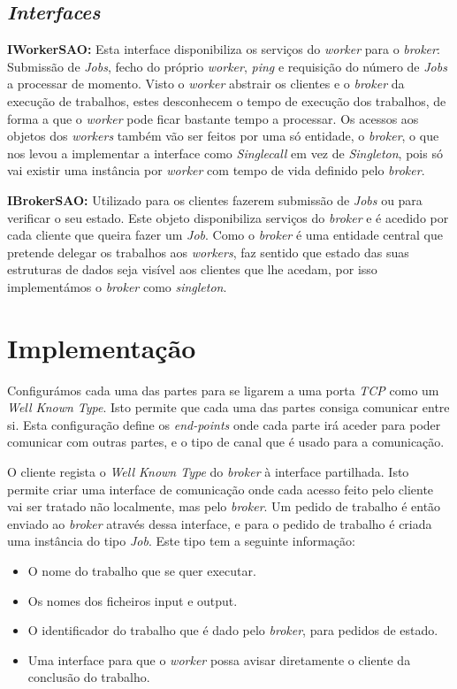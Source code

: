 \documentclass[a4paper]{article}
\begin{document}
\subsection{\emph{Interfaces}}

\textbf{IWorkerSAO:}
	Esta interface disponibiliza os serviços do \emph{worker} para o \emph{broker}: Submissão de \emph{Jobs}, fecho do próprio \emph{worker}, \emph{ping} e requisição do número de \emph{Jobs} a processar de momento. Visto o \emph{worker} abstrair os clientes e o \emph{broker} da execução de trabalhos, estes desconhecem o tempo de execução dos trabalhos, de forma a que o \emph{worker} pode ficar bastante tempo a processar. Os acessos aos objetos dos \emph{workers} também vão ser feitos por uma só entidade, o \emph{broker}, o que nos levou a implementar a interface como \emph{Singlecall} em vez de \emph{Singleton}, pois só vai existir uma instância por \emph{worker} com tempo de vida definido pelo \emph{broker}.

\textbf{IBrokerSAO:}
	Utilizado para os clientes fazerem submissão de \emph{Jobs} ou para verificar o seu estado. Este objeto disponibiliza serviços do \emph{broker} e é acedido por cada cliente que queira fazer um \emph{Job}. Como o \emph{broker} é uma entidade central que pretende delegar os trabalhos aos \emph{workers}, faz sentido que estado das suas estruturas de dados seja visível aos clientes que lhe acedam, por isso implementámos o \emph{broker} como \emph{singleton}.

\section{Implementação}

Configurámos cada uma das partes para se ligarem a uma porta \emph{TCP} como um \emph{Well Known Type}. Isto permite que cada uma das partes consiga comunicar entre si. Esta configuração define os \emph{end-points} onde cada parte irá aceder para poder comunicar com outras partes, e o tipo de canal que é usado para a comunicação.

O cliente regista o \emph{Well Known Type} do \emph{broker} à interface partilhada. Isto permite criar uma interface de comunicação onde cada acesso feito pelo cliente vai ser tratado não localmente, mas pelo \emph{broker}. Um pedido de trabalho é então enviado ao \emph{broker} através dessa interface, e para o pedido de trabalho é criada uma instância do tipo \emph{Job}. Este tipo tem a seguinte informação:
\begin{itemize}
\item O nome do trabalho que se quer executar.
\item Os nomes dos ficheiros input e output.
\item O identificador do trabalho que é dado pelo \emph{broker}, para pedidos de estado.
\item Uma interface para que o \emph{worker} possa avisar diretamente o cliente da conclusão do trabalho.
\end{itemize}
\end{document}
